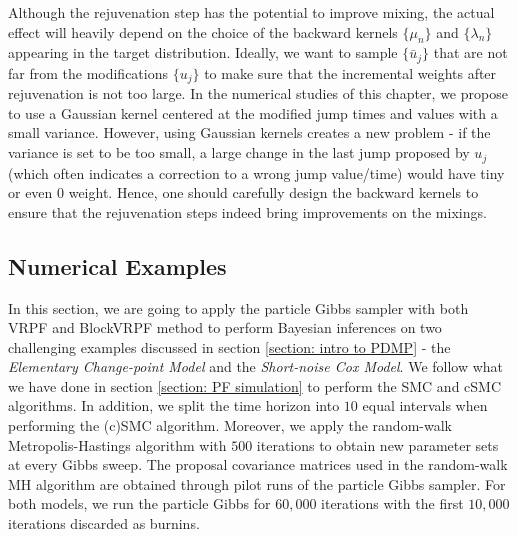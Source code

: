\documentclass[12pt,a4paper]{article}
\begin{document}
Although the rejuvenation step has the potential to improve mixing, the actual effect will heavily depend on the choice of the backward kernels \(\{\mu_n\}\) and \(\{\lambda_n\}\) appearing in the target distribution. Ideally, we want to sample \(\{\bar{u}_j\}\) that are not far from the modifications \(\{u_j\}\) to make sure that the incremental weights after rejuvenation is not too large. In the numerical studies of this chapter, we propose to use a Gaussian kernel centered at the modified jump times and values with a small variance. However, using Gaussian kernels creates a new problem - if the variance is set to be too small, a large change in the last jump proposed by \(u_j\) (which often indicates a correction to a wrong jump value/time) would have tiny or even 0 weight. Hence, one should carefully design the backward kernels to ensure that the rejuvenation steps indeed bring improvements on the mixings. 
\subsection{Numerical Examples}
In this section, we are going to apply the particle Gibbs sampler with both VRPF and BlockVRPF method to perform Bayesian inferences on two challenging examples discussed in section \ref{section: intro to PDMP}  - the \textit{Elementary Change-point Model} and the \textit{Short-noise Cox Model}.  We follow what we have done in section \ref{section: PF simulation} to perform the SMC and cSMC algorithms. In addition, we split the time horizon into \(10\) equal intervals when performing the (c)SMC algorithm. Moreover, we apply the random-walk Metropolis-Hastings algorithm with \(500\) iterations to obtain new parameter sets at every Gibbs sweep. The proposal covariance matrices used in the random-walk MH algorithm are obtained through pilot runs of the particle Gibbs sampler. For both models, we run the particle Gibbs for \(60,000\) iterations with the first \(10,000\) iterations discarded as burnins. 
\end{document}
